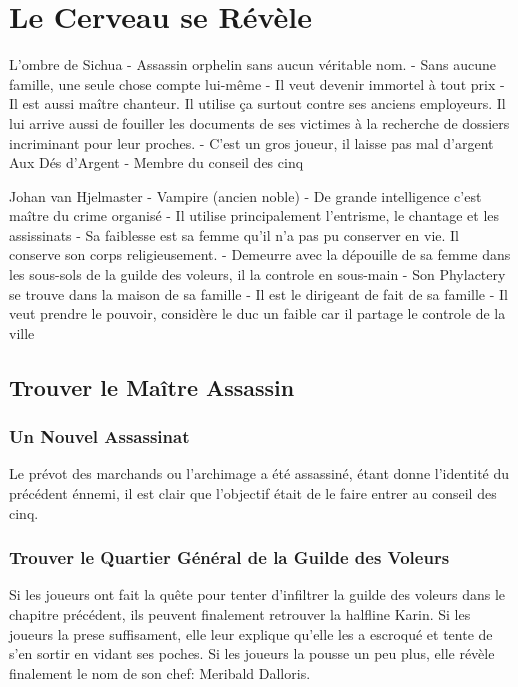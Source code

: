 \section{Le Cerveau se Révèle}

L'ombre de Sichua
 - Assassin orphelin sans aucun véritable nom.
 - Sans aucune famille, une seule chose compte lui-même
 - Il veut devenir immortel à tout prix
 - Il est aussi maître chanteur. Il utilise ça surtout contre ses anciens
   employeurs. Il lui arrive aussi de fouiller les documents de ses
   victimes à la recherche de dossiers incriminant pour leur proches.
 - C'est un gros joueur, il laisse pas mal d'argent Aux Dés d'Argent
 - Membre du conseil des cinq


Johan van Hjelmaster
 - Vampire (ancien noble)
 - De grande intelligence c'est maître du crime organisé
 - Il utilise principalement l'entrisme, le chantage et les assissinats
 - Sa faiblesse est sa femme qu'il n'a pas pu conserver en vie. Il conserve son corps religieusement.
 - Demeurre avec la dépouille de sa femme dans les sous-sols de la guilde des voleurs, il la controle 
   en sous-main
 - Son Phylactery se trouve dans la maison de sa famille
 - Il est le dirigeant de fait de sa famille
 - Il veut prendre le pouvoir, considère le duc un faible car il partage le controle de la ville

\subsection{Trouver le Maître Assassin}

\subsubsection{Un Nouvel Assassinat}

Le prévot des marchands ou l'archimage a été assassiné, étant donne l'identité du précédent énnemi,
il est clair que l'objectif était de le faire entrer au conseil des cinq.

\subsubsection{Trouver le Quartier Général de la Guilde des Voleurs}

Si les joueurs ont fait la quête pour tenter d'infiltrer la guilde des voleurs 
dans le chapitre précédent, ils peuvent finalement retrouver la halfline Karin.
Si les joueurs la prese suffisament, elle leur explique qu'elle les a escroqué
et tente de s'en sortir en vidant ses poches. Si les joueurs la pousse un peu
plus, elle révèle finalement le nom de son chef: Meribald Dalloris.



